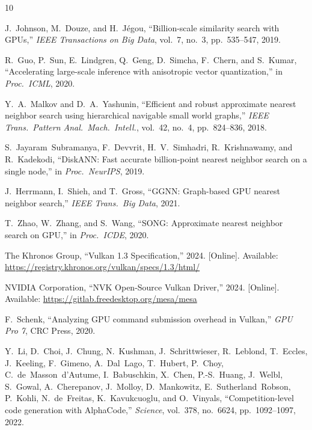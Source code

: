 \documentclass[conference]{IEEEtran}
\begin{document}
\begin{thebibliography}{10}

J.~Johnson, M.~Douze, and H.~J{\'e}gou,
``Billion-scale similarity search with GPUs,''
\emph{IEEE Transactions on Big Data}, vol.~7, no.~3, pp.~535--547, 2019.

R.~Guo, P.~Sun, E.~Lindgren, Q.~Geng, D.~Simcha, F.~Chern, and S.~Kumar,
``Accelerating large-scale inference with anisotropic vector quantization,''
in \emph{Proc.\ ICML}, 2020.

Y.~A.~Malkov and D.~A.~Yashunin,
``Efficient and robust approximate nearest neighbor search using hierarchical
navigable small world graphs,''
\emph{IEEE Trans.\ Pattern Anal.\ Mach.\ Intell.}, vol.~42, no.~4,
pp.~824--836, 2018.

S.~Jayaram~Subramanya, F.~Devvrit, H.~V.~Simhadri, R.~Krishnawamy, and
R.~Kadekodi,
``DiskANN: Fast accurate billion-point nearest neighbor search on a single
node,''
in \emph{Proc.\ NeurIPS}, 2019.

J.~Herrmann, I.~Shieh, and T.~Gross,
``GGNN: Graph-based GPU nearest neighbor search,''
\emph{IEEE Trans.\ Big Data}, 2021.

T.~Zhao, W.~Zhang, and S.~Wang,
``SONG: Approximate nearest neighbor search on GPU,''
in \emph{Proc.\ ICDE}, 2020.

The Khronos Group,
``Vulkan 1.3 Specification,'' 2024.
[Online]. Available: \url{https://registry.khronos.org/vulkan/specs/1.3/html/}

NVIDIA Corporation,
``NVK Open-Source Vulkan Driver,'' 2024.
[Online]. Available: \url{https://gitlab.freedesktop.org/mesa/mesa}

F.~Schenk,
``Analyzing GPU command submission overhead in Vulkan,''
\emph{GPU Pro 7}, CRC Press, 2020.

Y.~Li, D.~Choi, J.~Chung, N.~Kushman, J.~Schrittwieser, R.~Leblond,
T.~Eccles, J.~Keeling, F.~Gimeno, A.~Dal~Lago, T.~Hubert, P.~Choy,
C.~de~Masson~d'Autume, I.~Babuschkin, X.~Chen, P.-S.~Huang, J.~Welbl,
S.~Gowal, A.~Cherepanov, J.~Molloy, D.~Mankowitz, E.~Sutherland~Robson,
P.~Kohli, N.~de~Freitas, K.~Kavukcuoglu, and O.~Vinyals,
``Competition-level code generation with AlphaCode,''
\emph{Science}, vol.~378, no.~6624, pp.~1092--1097, 2022.


\end{thebibliography}
\end{document}
